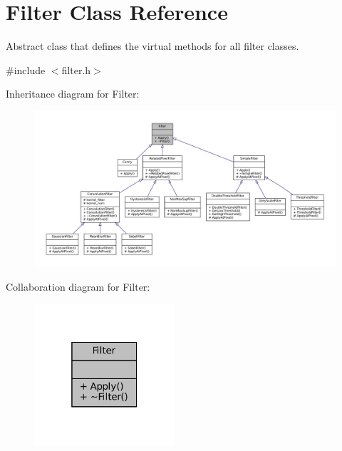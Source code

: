 \hypertarget{classFilter}{}\section{Filter Class Reference}
\label{classFilter}


Abstract class that defines the virtual methods for all filter classes.  




{\ttfamily \#include $<$filter.\+h$>$}



Inheritance diagram for Filter\+:\nopagebreak
\begin{figure}[H]
\begin{center}
\leavevmode
\includegraphics[width=350pt]{classFilter__inherit__graph}
\end{center}
\end{figure}


Collaboration diagram for Filter\+:\nopagebreak
\begin{figure}[H]
\begin{center}
\leavevmode
\includegraphics[width=148pt]{classFilter__coll__graph}
\end{center}
\end{figure}
